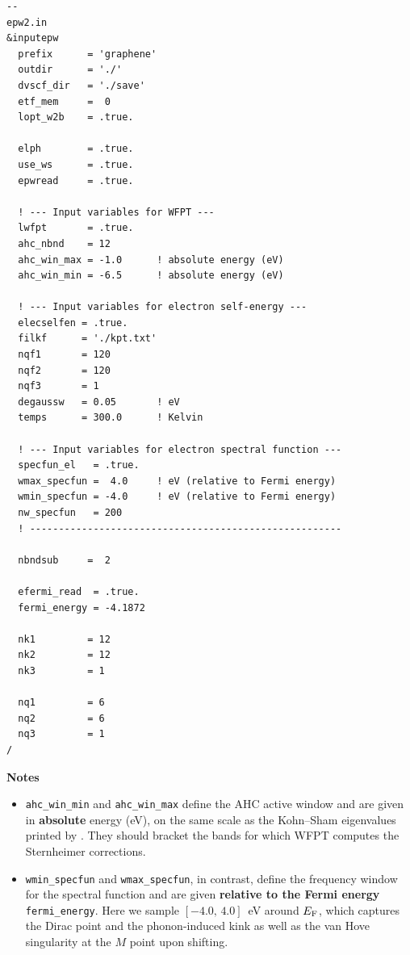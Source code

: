 \documentclass[a4paper,11pt,serif]{article}
\begin{document}
\begin{scriptsize}
\begin{Verbatim}[frame=single]
--                                                                                                 epw2.in
&inputepw
  prefix      = 'graphene'
  outdir      = './'
  dvscf_dir   = './save'
  etf_mem     =  0
  lopt_w2b    = .true.

  elph        = .true.
  use_ws      = .true.
  epwread     = .true.

  ! --- Input variables for WFPT ---
  lwfpt       = .true.
  ahc_nbnd    = 12
  ahc_win_max = -1.0      ! absolute energy (eV)
  ahc_win_min = -6.5      ! absolute energy (eV)

  ! --- Input variables for electron self-energy ---
  elecselfen = .true.
  filkf      = './kpt.txt'
  nqf1       = 120
  nqf2       = 120
  nqf3       = 1
  degaussw   = 0.05       ! eV
  temps      = 300.0      ! Kelvin

  ! --- Input variables for electron spectral function ---
  specfun_el   = .true.
  wmax_specfun =  4.0     ! eV (relative to Fermi energy)
  wmin_specfun = -4.0     ! eV (relative to Fermi energy)
  nw_specfun   = 200
  ! ------------------------------------------------------

  nbndsub     =  2

  efermi_read  = .true.
  fermi_energy = -4.1872

  nk1         = 12
  nk2         = 12
  nk3         = 1

  nq1         = 6
  nq2         = 6
  nq3         = 1
/
\end{Verbatim}
\end{scriptsize}

\begin{footnotesize}
   {\bf Notes}
   \begin{itemize}
      \item \texttt{ahc\_win\_min} and \texttt{ahc\_win\_max} define the AHC active window and are given in \textbf{absolute} energy (eV), on the same scale as the Kohn--Sham eigenvalues printed by . They should bracket the bands for which WFPT computes the Sternheimer corrections.
      \item \texttt{wmin\_specfun} and \texttt{wmax\_specfun}, in contrast, define the frequency window for the spectral function and are given \textbf{relative to the Fermi energy} \texttt{fermi\_energy}. Here we sample $[-4.0,\,4.0]$~eV around $E_{\rm F}$, which captures the Dirac point and the phonon-induced kink as well as the van Hove singularity at the $M$ point upon shifting.
   \end{itemize}
\end{footnotesize}
\end{document}
